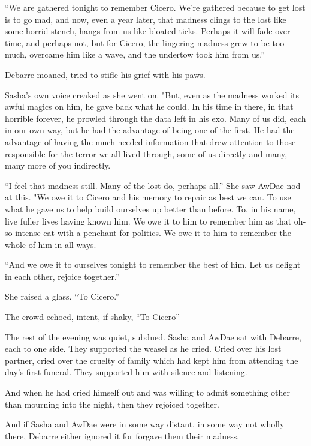 ``We are gathered tonight to remember Cicero. We're gathered because to get lost is to go mad, and now, even a year later, that madness clings to the lost like some horrid stench, hangs from us like bloated ticks. Perhaps it will fade over time, and perhaps not, but for Cicero, the lingering madness grew to be too much, overcame him like a wave, and the undertow took him from us.''

Debarre moaned, tried to stifle his grief with his paws.

Sasha's own voice creaked as she went on. "But, even as the madness worked its awful magics on him, he gave back what he could. In his time in there, in that horrible forever, he prowled through the data left in his exo. Many of us did, each in our own way, but he had the advantage of being one of the first. He had the advantage of having the much needed information that drew attention to those responsible for the terror we all lived through, some of us directly and many, many more of you indirectly.

``I feel that madness still. Many of the lost do, perhaps all.'' She saw AwDae nod at this. "We owe it to Cicero and his memory to repair as best we can. To use what he gave us to help build ourselves up better than before. To, in his name, live fuller lives having known him. We owe it to him to remember him as that oh-so-intense cat with a penchant for politics. We owe it to him to remember the whole of him in all ways.

``And we owe it to ourselves tonight to remember the best of him. Let us delight in each other, rejoice together.''

She raised a glass. ``To Cicero.''

The crowd echoed, intent, if shaky, ``To Cicero''

The rest of the evening was quiet, subdued. Sasha and AwDae sat with Debarre, each to one side. They supported the weasel as he cried. Cried over his lost partner, cried over the cruelty of family which had kept him from attending the day's first funeral. They supported him with silence and listening.

And when he had cried himself out and was willing to admit something other than mourning into the night, then they rejoiced together.

And if Sasha and AwDae were in some way distant, in some way not wholly there, Debarre either ignored it for forgave them their madness.
